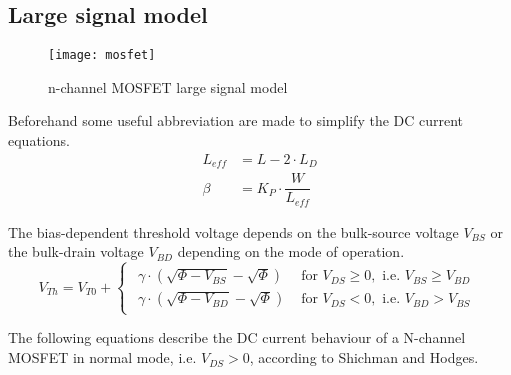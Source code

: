 \subsection{Large signal model}

\begin{figure}[ht]
\begin{center}
\texttt{[image: mosfet]}
\end{center}
\caption{n-channel MOSFET large signal model}
\label{fig:mosfet}
\end{figure}
\FloatBarrier

Beforehand some useful abbreviation are made to simplify the DC
current equations.
\begin{align}
L_{eff} &= L - 2\cdot L_D\\
\beta &= K_P\cdot \dfrac{W}{L_{eff}}
\end{align}

The bias-dependent threshold voltage depends on the bulk-source
voltage $V_{BS}$ or the bulk-drain voltage $V_{BD}$ depending on the
mode of operation.
\begin{equation}
V_{Th} = V_{T0} +
\begin{cases}
\begin{array}{ll}
\gamma\cdot\left(\sqrt{\Phi - V_{BS}} - \sqrt{\Phi}\right) & \textrm{ for } V_{DS} \ge 0, \textrm{ i.e. } V_{BS} \ge V_{BD}\\
\gamma\cdot\left(\sqrt{\Phi - V_{BD}} - \sqrt{\Phi}\right) & \textrm{ for } V_{DS} < 0, \textrm{ i.e. } V_{BD} > V_{BS}
\end{array}
\end{cases}
\end{equation}

The following equations describe the DC current behaviour of a
N-channel MOSFET in normal mode, i.e. $V_{DS} > 0$, according to
Shichman and Hodges.

